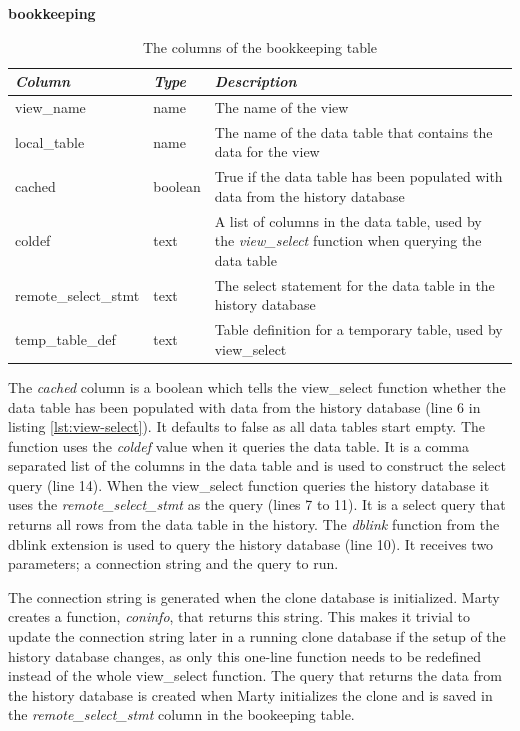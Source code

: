 \begin{table}[h]
  \centering
  \textbf{bookkeeping}
  \begin{tabularx}{\textwidth}{llX}
    \textit{Column} & \textit{Type} & \textit{Description} \\
    \midrule
    view\_name & name & The name of the view \\
    local\_table & name & The name of the data table that contains the data for the view \\
    cached & boolean & True if the data table has been populated with data from the history database \\
    coldef & text & A list of columns in the data table, used by the \textit{view\_select} function when querying the data table \\
    remote\_select\_stmt & text & The select statement for the data table in the history database \\
    temp\_table\_def & text & Table definition for a temporary table, used by view\_select \\
  \end{tabularx}
  \caption{The columns of the bookkeeping table}
  \label{tbl:bookkeeping}
\end{table}

The \textit{cached} column is a boolean which tells the view\_select function whether the data table has been populated with data from the history database (line 6 in listing \ref{lst:view-select}).
It defaults to false as all data tables start empty.
The function uses the \textit{coldef} value when it queries the data table.
It is a comma separated list of the columns in the data table and is used to construct the select query (line 14).
When the view\_select function queries the history database it uses the \textit{remote\_select\_stmt} as the query (lines 7 to 11).
It is a select query that returns all rows from the data table in the history.
The \textit{dblink} function from the dblink extension is used to query the history database (line 10).
It receives two parameters; a connection string and the query to run.

The connection string is generated when the clone database is initialized.
Marty creates a function, \textit{coninfo}, that returns this string.
This makes it trivial to update the connection string later in a running clone database if the setup of the history database changes, as only this one-line function needs to be redefined instead of the whole view\_select function.
The query that returns the data from the history database is created when Marty initializes the clone and is saved in the \textit{remote\_select\_stmt} column in the bookeeping table.


